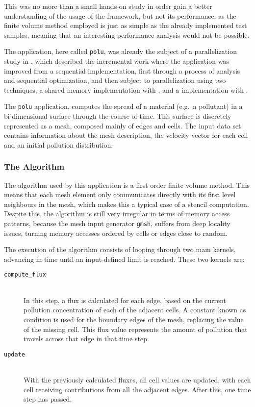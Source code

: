 \documentclass[main.tex]{subfiles}
\begin{document}
This was no more than a small hands-on study in order gain a better understanding of the usage of the framework, but not its performance, as the finite volume method employed is just as simple as the already implemented test samples, meaning that an interesting performance analysis would not be possible.


The application, here called \texttt{polu}, was already the subject of a parallelization study in \cite{naps2012}, which described the incremental work where the application was improved from a sequential implementation, first through a process of analysis and sequential optimization, and then subject to parallelization using two techniques, a shared memory \cpu implementation with \openmp, and a \gpu implementation with \cuda.

The \texttt{polu} application, computes the spread of a material (e.g.\ a pollutant) in a bi-dimensional surface through the course of time. This surface is discretely represented as a mesh, composed mainly of edges and cells. The input data set contains information about the mesh description, the velocity vector for each cell and an initial pollution distribution.

\subsubsection{The Algorithm} \label{sec:polu:alg}

The algorithm used by this application is a first order finite volume method. This means that each mesh element only communicates directly with its first level neighbours in the mesh, which makes this a typical case of a stencil computation. Despite this, the algorithm is still very irregular in terms of memory access patterns, because the mesh input generator \texttt{gmsh}, suffers from deep locality issues, turning memory accesses ordered by cells or edges close to random.

The execution of the algorithm consists of looping through two main kernels, advancing in time until an input-defined limit is reached. These two kernels are:
\begin{description}
\item[\texttt{compute\_flux}] \hfill \\
  In this step, a flux is calculated for each edge, based on the current pollution concentration of each of the adjacent cells. A constant known as  condition is used for the boundary edges of the mesh, replacing the value of the missing cell. This flux value represents the amount of pollution that travels across that edge in that time step.

\item[\texttt{update}] \hfill \\
  With the previously calculated fluxes, all cell values are updated, with each cell receiving contributions from all the adjacent edges. After this, one time step has passed.
\end{description}
\end{document}
